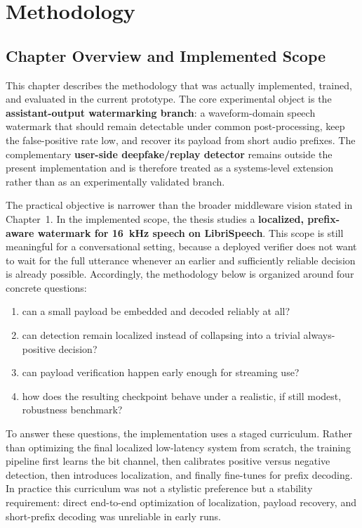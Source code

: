 
\chapter{Methodology}\label{chap:methodology}

\section{Chapter Overview and Implemented Scope}
This chapter describes the methodology that was actually implemented, trained, and evaluated in the current prototype. The core experimental object is the \textbf{assistant-output watermarking branch}: a waveform-domain speech watermark that should remain detectable under common post-processing, keep the false-positive rate low, and recover its payload from short audio prefixes. The complementary \textbf{user-side deepfake/replay detector} remains outside the present implementation and is therefore treated as a systems-level extension rather than as an experimentally validated branch.

The practical objective is narrower than the broader middleware vision stated in Chapter~1. In the implemented scope, the thesis studies a \textbf{localized, prefix-aware watermark for 16~kHz speech on LibriSpeech}. This scope is still meaningful for a conversational setting, because a deployed verifier does not want to wait for the full utterance whenever an earlier and sufficiently reliable decision is already possible. Accordingly, the methodology below is organized around four concrete questions:
\begin{enumerate}[leftmargin=1.25em]
  \item can a small payload be embedded and decoded reliably at all?
  \item can detection remain localized instead of collapsing into a trivial always-positive decision?
  \item can payload verification happen early enough for streaming use?
  \item how does the resulting checkpoint behave under a realistic, if still modest, robustness benchmark?
\end{enumerate}

To answer these questions, the implementation uses a staged curriculum. Rather than optimizing the final localized low-latency system from scratch, the training pipeline first learns the bit channel, then calibrates positive versus negative detection, then introduces localization, and finally fine-tunes for prefix decoding. In practice this curriculum was not a stylistic preference but a stability requirement: direct end-to-end optimization of localization, payload recovery, and short-prefix decoding was unreliable in early runs.

